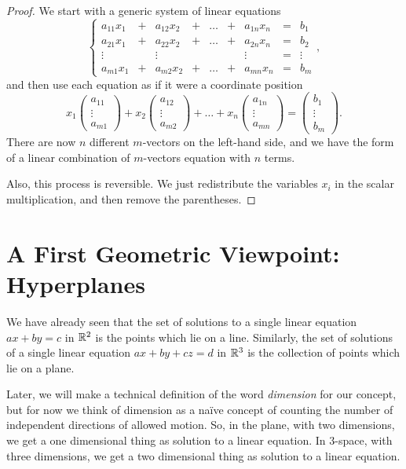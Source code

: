 \documentclass[00-livre-main.tex]{subfiles}
\begin{document}
\begin{proof}
We start with a generic system of linear equations
\[
\left\{\begin{array}{rrrrrrrrr}
a_{11} x_1 & + & a_{12} x_2 & + & \dots & + & a_{1n} x_n & = & b_1 \\
a_{21} x_1 & + & a_{22} x_2 & + & \dots & + & a_{2n} x_n & = & b_2 \\
\vdots & & \vdots & & & & \vdots & = & \vdots \\
a_{m1} x_1 & + & a_{m2} x_2 & + & \dots & + & a_{mn} x_n & = & b_m 
\end{array}\right. ,
\]
and then use each equation as if it were a coordinate position
\[
x_1 \begin{pmatrix} a_{11}\\ \vdots \\ a_{m1} \end{pmatrix} + 
x_2 \begin{pmatrix} a_{12}\\ \vdots \\ a_{m2} \end{pmatrix} +
\dots +
x_n \begin{pmatrix} a_{1n}\\ \vdots \\ a_{mn} \end{pmatrix} = 
\begin{pmatrix} b_1\\ \vdots \\ b_m \end{pmatrix} .
\]
There are now $n$ different $m$-vectors on the left-hand side, and we have the form of a linear combination of $m$-vectors equation with $n$ terms.

Also, this process is reversible. We just redistribute the variables $x_i$ in the
scalar multiplication, and then remove the parentheses. 
\end{proof}


\section{A First Geometric Viewpoint: Hyperplanes}

We have already seen that the set of solutions to a single linear equation $ax+by=c$ in $\mathbb{R}^2$ is the points which lie on a line. Similarly, the set of solutions of a single linear equation $ax+by+cz=d$ in $\mathbb{R}^3$ is the collection of points which lie on a plane. 

Later, we will make a technical definition of the word \emph{dimension} for our concept, but for now we think of dimension as a na\"ive concept of counting the number of independent directions of allowed motion. So, in the plane, with two dimensions, we get a one dimensional thing as solution to a linear equation. In $3$-space, with three dimensions, we get a two dimensional thing as solution to a linear equation.
\end{document}
